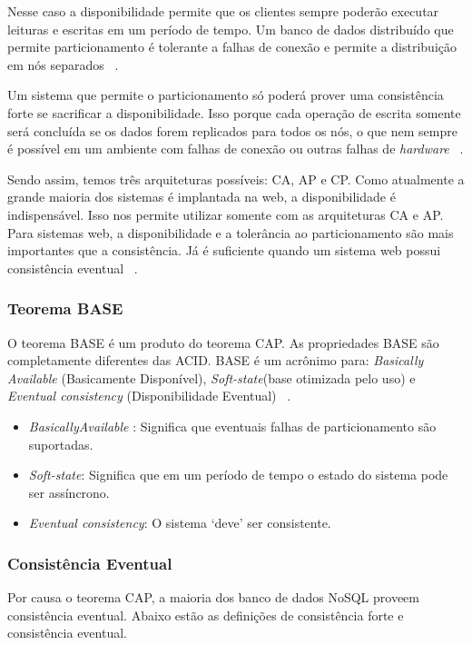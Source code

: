 Nesse caso a disponibilidade permite que os clientes sempre poderão executar leituras e escritas em um período de tempo. Um banco de dados distribuído que permite particionamento é tolerante a falhas de conexão e permite a distribuição em nós separados ~\cite{Orendanalysisand}.

Um sistema que permite o particionamento só poderá prover uma consistência forte se sacrificar a disponibilidade. Isso porque cada operação de escrita somente será concluída se os dados forem replicados para todos os nós, o que nem sempre é possível em um ambiente com falhas de conexão ou outras falhas de \textit{hardware} ~\cite{Orendanalysisand}.

Sendo assim, temos três arquiteturas possíveis: CA, AP e CP. Como atualmente a grande maioria dos sistemas é implantada na web, a disponibilidade é indispensável. Isso nos permite utilizar somente com as arquiteturas CA e AP. Para sistemas web, a disponibilidade e a tolerância ao particionamento são mais importantes que a consistência. Já é suficiente quando um sistema web possui consistência eventual ~\cite{nosqlaplicassandra}.

\subsubsection{Teorema BASE}

O teorema BASE é um produto do teorema CAP. As propriedades BASE são completamente diferentes das ACID. BASE é um acrônimo para: \textit{Basically Available} (Basicamente Disponível), \textit{Soft-state}(base otimizada pelo uso) e \textit{Eventual consistency} (Disponibilidade Eventual) ~\cite{nosqlaplicassandra}.

\begin{itemize}
\item \textit{BasicallyAvailable} : Significa que eventuais falhas de particionamento são suportadas.
\item \textit{Soft-state}: Significa que em um período de tempo o estado do sistema pode ser assíncrono.
\item \textit{Eventual consistency}: O sistema ‘deve’ ser consistente.
\end{itemize}

\subsubsection{Consistência Eventual}

Por causa o teorema CAP, a maioria dos banco de dados NoSQL proveem consistência eventual. Abaixo estão as definições de consistência forte e consistência eventual.

